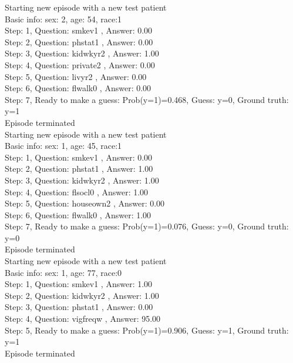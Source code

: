 \documentclass[reqno,11pt]{article}
\begin{document}
\noindent Starting new episode with a new test patient \\ [0.5ex] 
Basic info: sex: 2, age: 54, race:1 \\ [0.5ex] 
Step: 1, Question:  smkev1 , Answer: 0.00 \\ [0.5ex] 
Step: 2, Question:  phstat1 , Answer: 0.00 \\ [0.5ex] 
Step: 3, Question:  kidwkyr2 , Answer: 1.00 \\ [0.5ex] 
Step: 4, Question:  private2 , Answer: 0.00 \\ [0.5ex] 
Step: 5, Question:  livyr2 , Answer: 0.00 \\ [0.5ex] 
Step: 6, Question:  flwalk0 , Answer: 0.00 \\ [0.5ex] 
Step: 7, Ready to make a guess: Prob(y=1)=0.468, Guess: y=0, Ground truth: y=1 \\ [0.5ex] 
Episode terminated \\ [0.5ex] 

\noindent Starting new episode with a new test patient \\ [0.5ex] 
Basic info: sex: 1, age: 45, race:1 \\ [0.5ex] 
Step: 1, Question:  smkev1 , Answer: 0.00 \\ [0.5ex] 
Step: 2, Question:  phstat1 , Answer: 1.00 \\ [0.5ex] 
Step: 3, Question:  kidwkyr2 , Answer: 1.00 \\ [0.5ex] 
Step: 4, Question:  flsocl0 , Answer: 1.00 \\ [0.5ex] 
Step: 5, Question:  houseown2 , Answer: 0.00 \\ [0.5ex] 
Step: 6, Question:  flwalk0 , Answer: 1.00 \\ [0.5ex] 
Step: 7, Ready to make a guess: Prob(y=1)=0.076, Guess: y=0, Ground truth: y=0 \\ [0.5ex] 
Episode terminated \\ [0.5ex] 

\noindent Starting new episode with a new test patient \\ [0.5ex] 
Basic info: sex: 1, age: 77, race:0 \\ [0.5ex] 
Step: 1, Question:  smkev1 , Answer: 1.00 \\ [0.5ex] 
Step: 2, Question:  kidwkyr2 , Answer: 1.00 \\ [0.5ex] 
Step: 3, Question:  phstat1 , Answer: 0.00 \\ [0.5ex] 
Step: 4, Question:  vigfreqw , Answer: 95.00 \\ [0.5ex] 
Step: 5, Ready to make a guess: Prob(y=1)=0.906, Guess: y=1, Ground truth: y=1 \\ [0.5ex] 
Episode terminated \\ [0.5ex] 
\end{document}
